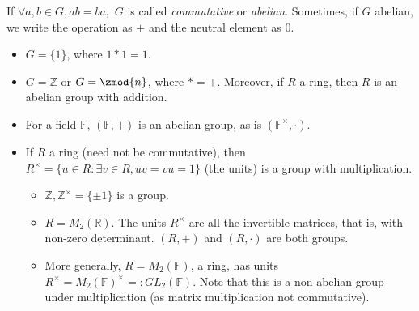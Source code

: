 \documentclass[12pt,oneside]{article}
\begin{document}
\begin{definition}\label{def:abeliangroup}
  If $\forall a, b \in G, ab = ba,$ $G$ is called \emph{commutative} or \emph{abelian}. Sometimes, if $G$ abelian, we write the operation as $+$ and the neutral element as $0$.
\end{definition}

\begin{example}
  \begin{itemize}
    \item $G = \{1\}$, where $1 \ast 1 = 1$.
    \item $G = \mathbb{Z}$ or $G = \zmod{n}$, where $\ast = +$. Moreover, if $R$ a ring, then $R$ is an abelian group with addition.
    \item For a field $\mathbb{F}$, $(\mathbb{F}, +)$ is an abelian group, as is $(\mathbb{F}^{\times}, \cdot)$.
    \item If $R$ a ring (need not be commutative), then $R^{\times} = \{u \in R : \exists v \in R, uv = vu = 1\}$ (the units) is a group with multiplication.
    
    \begin{itemize}
      \item $\mathbb{Z}, \mathbb{Z}^{\times} = \{\pm 1\}$ is a group.
      \item $R = M_2 (\mathbb{R})$. The units $R^{\times}$ are all the invertible matrices, that is, with non-zero determinant. $(R, +)$ and $(R, \cdot)$ are both groups.
      \item More generally, $R = M_2(\mathbb{F})$, a ring, has units $R^{\times} = M_2(\mathbb{F})^{\times} =: GL_2 (\mathbb{F})$. Note that this is a non-abelian group under multiplication (as matrix multiplication not commutative).
    \end{itemize}
  \end{itemize}
\end{example}











\end{document}
